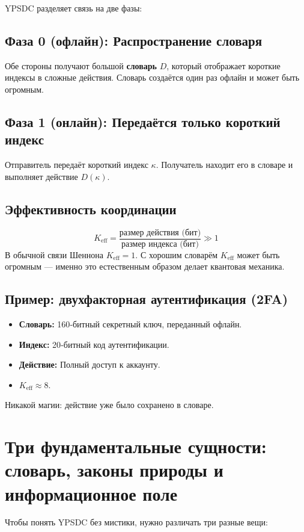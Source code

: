 \documentclass[12pt,a4paper]{article}
\begin{document}
	YPSDC разделяет связь на две фазы:
	
	\subsection{Фаза 0 (офлайн): Распространение словаря}
	Обе стороны получают большой \textbf{словарь} \(D\), который отображает короткие индексы в сложные действия. Словарь создаётся один раз офлайн и может быть огромным.
	
	\subsection{Фаза 1 (онлайн): Передаётся только короткий индекс}
	Отправитель передаёт короткий индекс \(\kappa\). Получатель находит его в словаре и выполняет действие \(D(\kappa)\).
	
	\subsection{Эффективность координации}
	\[
	K_{\mathrm{eff}} = \frac{\text{размер действия (бит)}}{\text{размер индекса (бит)}} \gg 1
	\]
	В обычной связи Шеннона \(K_{\mathrm{eff}}=1\). С хорошим словарём \(K_{\mathrm{eff}}\) может быть огромным — именно это естественным образом делает квантовая механика.
	
	\subsection{Пример: двухфакторная аутентификация (2FA)}
	\begin{itemize}
		\item \textbf{Словарь:} 160‑битный секретный ключ, переданный офлайн.
		\item \textbf{Индекс:} 20‑битный код аутентификации.
		\item \textbf{Действие:} Полный доступ к аккаунту.
		\item \(K_{\mathrm{eff}} \approx 8\).
	\end{itemize}
	Никакой магии: действие уже было сохранено в словаре.
	
	\section{Три фундаментальные сущности: словарь, законы природы и информационное поле}
	
	Чтобы понять YPSDC без мистики, нужно различать три разные вещи:
	
\end{document}
